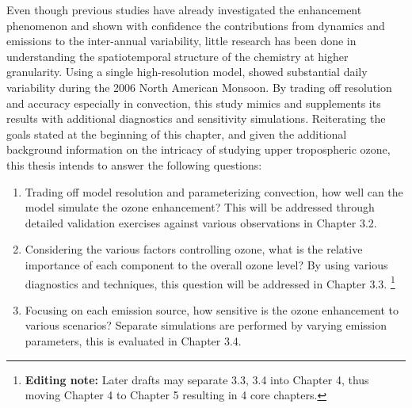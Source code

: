 Even though previous studies have already investigated the enhancement phenomenon and shown
with confidence the contributions from dynamics and emissions to the inter-annual variability, little
research has been done in understanding the spatiotemporal structure of the chemistry at higher granularity.
Using a single high-resolution model, \citet{Barth:2012qf} showed substantial daily variability during the
2006 North American Monsoon. By trading off resolution and accuracy especially in convection, this
study mimics \citet{Barth:2012qf} and supplements its results with additional diagnostics and sensitivity
simulations. Reiterating the goals stated at the beginning of this chapter, and given the additional
background information on the intricacy of studying upper tropospheric ozone, this thesis intends to
answer the following questions:
\begin{enumerate}
\item{} Trading off model resolution and parameterizing convection, how well can the model simulate the
ozone enhancement? This will be addressed through detailed validation exercises against various
observations in Chapter 3.2.
\item{} Considering the various factors controlling ozone, what is the relative importance of each component
to the overall ozone level? By using various diagnostics and techniques, this question will be addressed
in Chapter 3.3. \footnote{{\bf Editing note:} Later drafts may separate 3.3, 3.4 into Chapter 4, thus moving
Chapter 4 to Chapter 5 resulting in 4 core chapters.}
\item{} Focusing on each emission source, how sensitive is the ozone enhancement to various scenarios?
Separate simulations are performed by varying emission parameters, this is evaluated in Chapter 3.4.
\end{enumerate}


